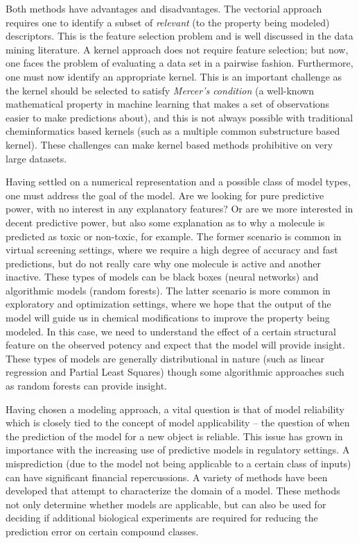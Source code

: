 \documentclass{sig-alternate}
\begin{document}
Both methods have advantages and disadvantages. The vectorial approach
requires one to identify a subset of \emph{relevant} (to the property
being modeled) descriptors. This is the feature selection problem and
is well discussed in the data mining literature. A kernel approach
does not require feature selection; but now, one faces the problem of
evaluating a data set in a pairwise fashion. Furthermore, one must now
identify an appropriate kernel. This is an important challenge as the
kernel should be selected to satisfy \emph{Mercer's condition} (a well-known mathematical property in machine learning that makes a set of observations easier to make predictions about), and this is
not always possible with traditional cheminformatics based kernels
(such as a multiple common substructure based kernel). These
challenges can make kernel based methods prohibitive on very large
datasets.

Having settled on a numerical representation and a possible class of
model types, one must address the goal of the model. Are we
looking for pure predictive power, with no interest in any explanatory
features? Or are we more interested in decent predictive power, but
also some explanation as to why a molecule is predicted as toxic or
non-toxic, for example. The former scenario is common in virtual
screening settings, where we require a high degree of accuracy and fast
predictions, but do not really care why one molecule is active
and another inactive. These types of models can be black boxes (neural
networks) and algorithmic models \cite{Breiman:2001fk} (random
forests). The latter scenario is more common in exploratory and
optimization settings, where we hope that the output of the model will
guide us in chemical modifications to improve the property being
modeled.  In this case, we need to understand the effect of a
certain structural feature on the observed potency and expect that the
model will provide insight. These types of models are generally
distributional in nature (such as linear regression and Partial Least Squares) though
some algorithmic approaches such as random forests can provide insight.

Having chosen a modeling approach, a vital question is that of model
reliability which is closely tied to the concept of model
applicability -- the question of when the prediction of the model for
a new object is reliable. This issue has grown in importance with the
increasing use of predictive models in regulatory settings. A
misprediction (due to the model not being applicable to a certain class
of inputs) can have significant financial repercussions. A variety of
methods have been developed that attempt to characterize the domain of
a model. These methods not only determine whether models are
applicable, but can also be used for deciding if additional biological
experiments are required for reducing the prediction error on certain
compound classes.
\end{document}
